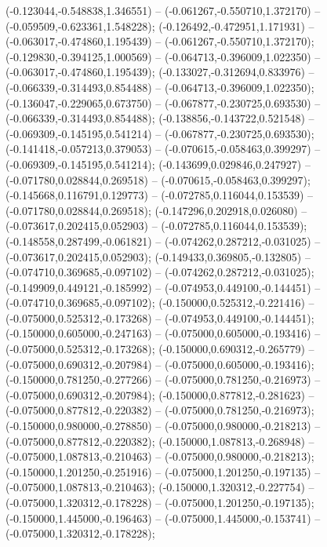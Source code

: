  (-0.123044,-0.548838,1.346551) -- (-0.061267,-0.550710,1.372170) -- (-0.059509,-0.623361,1.548228);
 (-0.126492,-0.472951,1.171931) -- (-0.063017,-0.474860,1.195439) -- (-0.061267,-0.550710,1.372170);
 (-0.129830,-0.394125,1.000569) -- (-0.064713,-0.396009,1.022350) -- (-0.063017,-0.474860,1.195439);
 (-0.133027,-0.312694,0.833976) -- (-0.066339,-0.314493,0.854488) -- (-0.064713,-0.396009,1.022350);
 (-0.136047,-0.229065,0.673750) -- (-0.067877,-0.230725,0.693530) -- (-0.066339,-0.314493,0.854488);
 (-0.138856,-0.143722,0.521548) -- (-0.069309,-0.145195,0.541214) -- (-0.067877,-0.230725,0.693530);
 (-0.141418,-0.057213,0.379053) -- (-0.070615,-0.058463,0.399297) -- (-0.069309,-0.145195,0.541214);
 (-0.143699,0.029846,0.247927) -- (-0.071780,0.028844,0.269518) -- (-0.070615,-0.058463,0.399297);
 (-0.145668,0.116791,0.129773) -- (-0.072785,0.116044,0.153539) -- (-0.071780,0.028844,0.269518);
 (-0.147296,0.202918,0.026080) -- (-0.073617,0.202415,0.052903) -- (-0.072785,0.116044,0.153539);
 (-0.148558,0.287499,-0.061821) -- (-0.074262,0.287212,-0.031025) -- (-0.073617,0.202415,0.052903);
 (-0.149433,0.369805,-0.132805) -- (-0.074710,0.369685,-0.097102) -- (-0.074262,0.287212,-0.031025);
 (-0.149909,0.449121,-0.185992) -- (-0.074953,0.449100,-0.144451) -- (-0.074710,0.369685,-0.097102);
 (-0.150000,0.525312,-0.221416) -- (-0.075000,0.525312,-0.173268) -- (-0.074953,0.449100,-0.144451);
 (-0.150000,0.605000,-0.247163) -- (-0.075000,0.605000,-0.193416) -- (-0.075000,0.525312,-0.173268);
 (-0.150000,0.690312,-0.265779) -- (-0.075000,0.690312,-0.207984) -- (-0.075000,0.605000,-0.193416);
 (-0.150000,0.781250,-0.277266) -- (-0.075000,0.781250,-0.216973) -- (-0.075000,0.690312,-0.207984);
 (-0.150000,0.877812,-0.281623) -- (-0.075000,0.877812,-0.220382) -- (-0.075000,0.781250,-0.216973);
 (-0.150000,0.980000,-0.278850) -- (-0.075000,0.980000,-0.218213) -- (-0.075000,0.877812,-0.220382);
 (-0.150000,1.087813,-0.268948) -- (-0.075000,1.087813,-0.210463) -- (-0.075000,0.980000,-0.218213);
 (-0.150000,1.201250,-0.251916) -- (-0.075000,1.201250,-0.197135) -- (-0.075000,1.087813,-0.210463);
 (-0.150000,1.320312,-0.227754) -- (-0.075000,1.320312,-0.178228) -- (-0.075000,1.201250,-0.197135);
 (-0.150000,1.445000,-0.196463) -- (-0.075000,1.445000,-0.153741) -- (-0.075000,1.320312,-0.178228);
